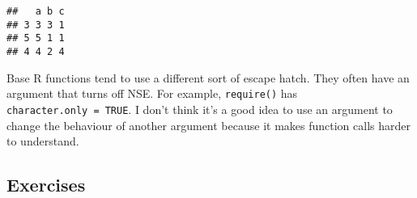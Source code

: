 \begin{Shaded}
\begin{Highlighting}[]
\OperatorTok{>=}\StringTok{ }\NormalTok{)}
\end{Highlighting}
\end{Shaded}

\begin{verbatim}
##   a b c
## 3 3 3 1
## 5 5 1 1
## 4 4 2 4
\end{verbatim}

Base R functions tend to use a different sort of escape hatch. They
often have an argument that turns off NSE. For example,
\texttt{require()} has \texttt{character.only\ =\ TRUE}. I don't think
it's a good idea to use an argument to change the behaviour of another
argument because it makes function calls harder to understand.

\hypertarget{exercises-3}{%
\subsection{Exercises}\label{exercises-3}}

